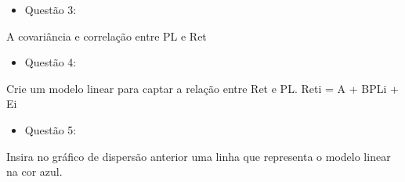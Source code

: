 \documentclass[
]{article}
\newenvironment{Shaded}{\begin{snugshade}}{\end{snugshade}}
\newcommand{\AttributeTok}[1]{\textcolor[rgb]{0.77,0.63,0.00}{#1}}
\newcommand{\FunctionTok}[1]{\textcolor[rgb]{0.00,0.00,0.00}{#1}}
\newcommand{\NormalTok}[1]{#1}
\newcommand{\OtherTok}[1]{\textcolor[rgb]{0.56,0.35,0.01}{#1}}
\newcommand{\SpecialCharTok}[1]{\textcolor[rgb]{0.00,0.00,0.00}{#1}}
\newcommand{\StringTok}[1]{\textcolor[rgb]{0.31,0.60,0.02}{#1}}
\providecommand{\tightlist}{%
  \setlength{\itemsep}{0pt}\setlength{\parskip}{0pt}}
\begin{document}
\begin{itemize}
\tightlist
\item
  Questão 3:
\end{itemize}

A covariância e correlação entre PL e Ret

\begin{Shaded}
\end{Shaded}

\begin{itemize}
\tightlist
\item
  Questão 4:
\end{itemize}

Crie um modelo linear para captar a relação entre Ret e PL. Reti = A +
BPLi + Ei

\begin{Shaded}
\end{Shaded}

\begin{itemize}
\tightlist
\item
  Questão 5:
\end{itemize}

Insira no gráfico de dispersão anterior uma linha que representa o
modelo linear na cor azul.
\end{document}
